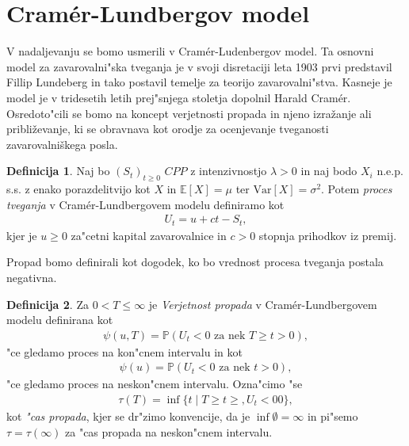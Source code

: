 \documentclass[12pt, a4paper, reqno]{amsart}
\theoremstyle{definition} %
\newtheorem{definicija}{Definicija}[section]
\theoremstyle{plain} %
\newcommand{\E}{\mathbb{E}}
\newcommand{\Prob}{\mathbb{P}}
\newcommand{\1}{\mathds{1}}
\newcommand{\Var}[1]{\text{Var}\left[#1\right]}
\begin{document}
\section{Cramér-Lundbergov model}
    V nadaljevanju se bomo usmerili v Cramér-Ludenbergov model. Ta osnovni model za zavarovalni"ska
    tveganja je v svoji disretaciji leta 1903 prvi predstavil Fillip Lundeberg in tako postavil temelje
    za teorijo zavarovalni"stva. Kasneje je model je v tridesetih letih prej"snjega stoletja dopolnil 
    Harald Cramér. Osredoto"cili se bomo na koncept verjetnosti propada in njeno izražanje ali približevanje,
    ki se obravnava kot orodje za ocenjevanje tveganosti zavarovalniškega posla.

    \begin{definicija}
        Naj bo $(S_t)_{t\geq0}$ $CPP$ z intenzivnostjo $\lambda > 0$ in naj bodo $X_i$ n.e.p. s.s.
        z enako porazdelitvijo kot $X$ in $\E\left[X\right] = \mu$ ter $\Var{X} = \sigma^2$. Potem 
        \textit{proces tveganja} v Cramér-Lundbergovem modelu definiramo kot
        \begin{align*}
            U_t = u + ct - S_t,
        \end{align*}
        kjer je $u \geq 0$ za"cetni kapital zavarovalnice in $c>0$ stopnja prihodkov iz premij. 
        \label{def:procesTveganja}
    \end{definicija}

    Propad bomo definirali kot dogodek, ko bo vrednost procesa tveganja postala negativna.

    \begin{definicija}
        Za $0<T\leq\infty$ je \textit{Verjetnost propada} v Cramér-Lundbergovem modelu definirana kot
        \begin{align*}
            \psi(u, T) = \Prob(U_t < 0 \text{ za nek } T \geq t > 0), 
        \end{align*}
        "ce gledamo proces na kon"cnem intervalu in kot
        \begin{align*}
            \psi(u) = \Prob(U_t < 0 \text{ za nek } t > 0),
        \end{align*}
        "ce gledamo proces na neskon"cnem intervalu. Ozna"cimo "se 
        \begin{align*}
            \tau(T)=\inf\{t\mid T\geq t\geq, U_t <0 0\}, 
        \end{align*}
        kot \textit{"cas propada}, kjer se dr"zimo konvencije, da je $\inf\emptyset = \infty$ in 
        pi"semo $\tau = \tau(\infty)$ za "cas propada na neskon"cnem intervalu.
        \label{def:verjetnostPropadaInCasiPropada}   
    \end{definicija}
\end{document}
